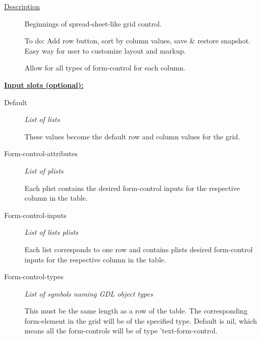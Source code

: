 \documentclass [11pt]{book}
\begin{document}
\begin{itemize}
\begin{description}

\item [
\underline{Description}]


Beginnings of spread-sheet-like 
grid control.

To do: Add row button, sort by column values, 
save \& restore snapshot. Easy way for user to 
customize layout and markup.

Allow for all types of form-control for each column.





\end{description}








\textbf{
\underline{Input slots (optional):}}

\begin{description}

\item [Default]
\emph{List of lists}

 These values become the default row and column
values for the grid.




\item [Form-control-attributes]
\emph{List of plists}

 Each plist contains the desired form-control
inputs for the respective column in the table.




\item [Form-control-inputs]
\emph{List of lists plists}

 Each list corresponds to one row
and contains plists desired form-control inputs for the
respective column in the table.




\item [Form-control-types]
\emph{List of symbols naming GDL object types}

 This must be
the same length as a row of the table. The corresponding
form-element in the grid will be of the specified type.
Default is nil, which means all the form-controls will
be of type 'text-form-control.





\end{description}
\end{itemize}
\end{document}
